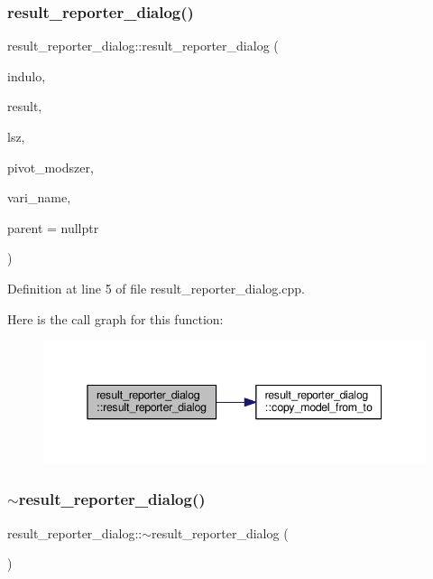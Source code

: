 \subsubsection{\texorpdfstring{result\+\_\+reporter\+\_\+dialog()}{result\_reporter\_dialog()}\hspace{0.1cm}{\footnotesize\ttfamily [1/2]}}
{\footnotesize\ttfamily result\+\_\+reporter\+\_\+dialog\+::result\+\_\+reporter\+\_\+dialog (\begin{DoxyParamCaption}\item[{Q\+Standard\+Item\+Model $\ast$}]{indulo,  }\item[{Q\+Standard\+Item\+Model $\ast$}]{result,  }\item[{int}]{lsz,  }\item[{Q\+String}]{pivot\+\_\+modszer,  }\item[{Q\+String}]{vari\+\_\+name,  }\item[{Q\+Widget $\ast$}]{parent = {\ttfamily nullptr} }\end{DoxyParamCaption})\hspace{0.3cm}{\ttfamily [explicit]}}



Definition at line 5 of file result\+\_\+reporter\+\_\+dialog.\+cpp.

Here is the call graph for this function\+:\nopagebreak
\begin{figure}[H]
\begin{center}
\leavevmode
\includegraphics[width=345pt]{classresult__reporter__dialog_ad6b12890998c80ec5f69ee28ad28e533_cgraph}
\end{center}
\end{figure}
\mbox{\label{classresult__reporter__dialog_a1d44819c105ea7c09e87d73247cf0efc}} 
\subsubsection{\texorpdfstring{$\sim$result\+\_\+reporter\+\_\+dialog()}{~result\_reporter\_dialog()}\hspace{0.1cm}{\footnotesize\ttfamily [1/2]}}
{\footnotesize\ttfamily result\+\_\+reporter\+\_\+dialog\+::$\sim$result\+\_\+reporter\+\_\+dialog (\begin{DoxyParamCaption}{ }\end{DoxyParamCaption})}




